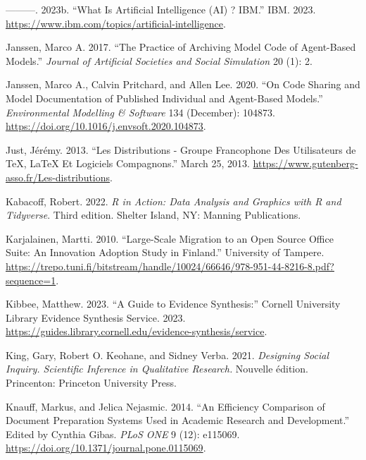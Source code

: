 \documentclass[
  letterpaper,
]{scrbook}
\newlength{\cslhangindent}
\newlength{\cslentryspacingunit} %
\newenvironment{CSLReferences}[2] %
 {%
  \setlength{\parindent}{0pt}
  \ifodd #1
  \let\oldpar\par
  \def\par{\hangindent=\cslhangindent\oldpar}
  \fi
  \setlength{\parskip}{#2\cslentryspacingunit}
 }%
 {}
\begin{document}
\begin{CSLReferences}{1}{0}
\leavevmode{}%
---------. 2023b. {``What Is {Artificial Intelligence} ({AI}) ?
\textbar{} {IBM}.''} IBM. 2023.
\url{https://www.ibm.com/topics/artificial-intelligence}.

\leavevmode{}%
Janssen, Marco A. 2017. {``The {Practice} of {Archiving Model Code} of
{Agent-Based Models}.''} \emph{Journal of Artificial Societies and
Social Simulation} 20 (1): 2.

\leavevmode{}%
Janssen, Marco A., Calvin Pritchard, and Allen Lee. 2020. {``On Code
Sharing and Model Documentation of Published Individual and Agent-Based
Models.''} \emph{Environmental Modelling \& Software} 134 (December):
104873. \url{https://doi.org/10.1016/j.envsoft.2020.104873}.

\leavevmode{}%
Just, Jérémy. 2013. {``Les Distributions - {Groupe} Francophone Des
{Utilisateurs} de {TeX}, {LaTeX} Et Logiciels Compagnons.''} March 25,
2013. \url{https://www.gutenberg-asso.fr/Les-distributions}.

\leavevmode{}%
Kabacoff, Robert. 2022. \emph{R in Action: Data Analysis and Graphics
with {R} and {Tidyverse}}. Third edition. Shelter Island, NY: Manning
Publications.

\leavevmode{}%
Karjalainen, Martti. 2010. {``Large-Scale Migration to an Open Source
Office Suite: {An} Innovation Adoption Study in {Finland}.''} University
of Tampere.
\url{https://trepo.tuni.fi/bitstream/handle/10024/66646/978-951-44-8216-8.pdf?sequence=1}.

\leavevmode{}%
Kibbee, Matthew. 2023. {``A {Guide} to {Evidence Synthesis}:''} Cornell
University Library Evidence Synthesis Service. 2023.
\url{https://guides.library.cornell.edu/evidence-synthesis/service}.

\leavevmode{}%
King, Gary, Robert O. Keohane, and Sidney Verba. 2021. \emph{Designing
{Social Inquiry}. {Scientific Inference} in {Qualitative Research}.}
Nouvelle édition. Princenton: Princeton University Press.

\leavevmode{}%
Knauff, Markus, and Jelica Nejasmic. 2014. {``An {Efficiency Comparison}
of {Document Preparation Systems Used} in {Academic Research} and
{Development}.''} Edited by Cynthia Gibas. \emph{PLoS ONE} 9 (12):
e115069. \url{https://doi.org/10.1371/journal.pone.0115069}.


\end{CSLReferences}
\end{document}
